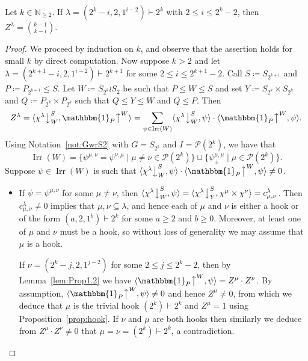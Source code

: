 \documentclass[ALCO, Unicode]{cedram}
\newcommand{\triv}{\mathbbm{1}}
\newcommand{\Irr}{\operatorname{Irr}}
\newcommand{\down}{\big\downarrow}
\newcommand{\up}{\big\uparrow}
\newcommand{\cP}{\mathcal{P}}
\newcommand{\N}{\mathbb{N}}
\begin{document}
\begin{lemma}\label{lem:a-2-1b}
	Let $k\in\N_{\ge 2}$. If $\lambda=(2^k-i,2,1^{i-2})\vdash 2^k$ with $2\le i\le 2^k-2$, then $Z^\lambda = \binom{k-1}{k-i}$.
\end{lemma}

\begin{proof}
	We proceed by induction on $k$, and observe that the assertion holds for small $k$ by direct computation. 
	Now suppose $k>2$ and let $\lambda=(2^{k+1}-i,2,1^{i-2})\vdash 2^{k+1}$ for some $2\le i\le 2^{k+1}-2$. Call $S\coloneqq S_{2^{k+1}}$ and $P\coloneqq P_{2^{k+1}}\le S$. Let $W\coloneqq S_{2^k}\wr S_2$ be such that $P\le W\le S$ and set $Y\coloneqq S_{2^k}\times S_{2^k}$ and $Q\coloneqq P_{2^k}\times P_{2^k}$ such that $Q\le Y\le W$ and $Q\le P$. Then
	\[ Z^\lambda =\langle \chi^\lambda\down^S_W, \triv_P\up^W\rangle = \sum_{\psi\in\Irr(W)} \langle \chi^\lambda\down^S_W,\psi\rangle \cdot \langle \triv_P\up^W,\psi\rangle.
	\]
	Using Notation~\ref{not:GwrS2} with $G=S_{2^k}$ and $I=\cP(2^k)$, we have that 
	\[ \Irr(W) = \{\psi^{\mu,\nu}=\psi^{\nu,\mu} \mid \mu\ne\nu\in\cP(2^k) \} \sqcup \{ \psi^{\mu,\mu}_{\pm} \mid \mu\in\cP(2^k) \}. \]
	Suppose $\psi\in\Irr(W)$ is such that $\langle \chi^\lambda\down^S_W,\psi\rangle \cdot \langle \triv_P\up^W,\psi\rangle\ne 0$.
	\begin{itemize}
		\item If $\psi=\psi^{\mu,\nu}$ for some $\mu\ne\nu$, then $\langle \chi^\lambda\down^S_W,\psi\rangle = \langle \chi^\lambda\down^S_Y, \chi^\mu\times\chi^\nu\rangle = c^\lambda_{\mu,\nu}$. Then $c^\lambda_{\mu,\nu}\ne 0$ implies that $\mu,\nu\subseteq\lambda$, and hence each of $\mu$ and $\nu$ is either a hook or of the form $(a,2,1^b)\vdash 2^k$ for some $a\ge 2$ and $b\ge 0$. Moreover, at least one of $\mu$ and $\nu$ must be a hook, so without loss of generality we may assume that $\mu$ is a hook.
		
		If $\nu=(2^k-j,2,1^{j-2})$ for some $2\le j\le 2^k-2$, then by Lemma~\ref{lem:Prop1.2} we have $\langle \triv_P\up^W,\psi\rangle = Z^\mu\cdot Z^\nu$. By assumption, $\langle \triv_P\up^W,\psi\rangle\ne 0$ and hence $Z^\mu\ne 0$, from which we deduce that $\mu$ is the trivial hook $(2^k)\vdash 2^k$ and $Z^\mu=1$ using Proposition~\ref{prop:hook}.		
		If $\nu$ and $\mu$ are both hooks then similarly we deduce from $Z^\mu\cdot Z^\nu\ne 0$ that $\mu=\nu=(2^k)\vdash 2^k$, a contradiction.
		

\end{itemize}
\end{proof}
\end{document}

